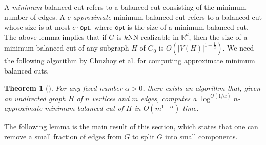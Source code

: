 \documentclass[11pt]{article}
\newtheorem{theorem}{Theorem}
\begin{document}
A \textit{minimum} balanced cut refers to a balanced cut consisting of the minimum number of edges.
A \textit{$c$-approximate} minimum balanced cut refers to a balanced cut whose size is at most $c \cdot \mathsf{opt}$, where $\mathsf{opt}$ is the size of a minimum balanced cut.
The above lemma implies that if $G$ is $k$NN-realizable in $\mathbb{R}^d$, then the size of a minimum balanced cut of any subgraph $H$ of $G_0$ is $O(|V(H)|^{1-\frac{1}{d}})$.
We need the following algorithm by Chuzhoy et al. for computing approximate minimum balanced cuts.
\begin{theorem}[\cite{chuzhoy2020deterministic}] \label{thm-cut}
For any fixed number $\alpha > 0$, there exists an algorithm that, given an undirected graph $H$ of $n$ vertices and $m$ edges, computes a $\log^{O(1/\alpha)} n$-approximate minimum balanced cut of $H$ in $O(m^{1+\alpha})$ time.
\end{theorem}

The following lemma is the main result of this section, which states that one can remove a small fraction of edges from $G$ to split $G$ into small components.
\end{document}
